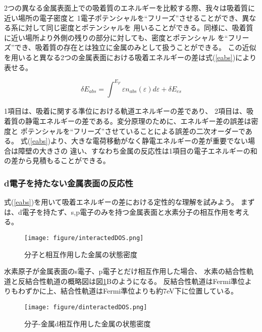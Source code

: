 \documentclass[12pt]{ltjsarticle}
\begin{document}
2つの異なる金属表面上での吸着質のエネルギーを比較する際、我々は吸着質に近い場所の電子密度と
1電子ポテンシャルを“フリーズ”させることができ、異なる系に対して同じ密度とポテンシャルを
用いることができる。同様に、吸着質に近い場所より外側の残りの部分に対しても、密度とポテンシャル
を“フリーズ”でき、吸着質の存在とは独立に金属のみとして扱うことができる。
この近似を用いると異なる2つの金属表面における吸着エネルギーの差は式(\ref{eabs})により表せる。

\begin{equation}
    \label{eabs}
    \delta E_{abs} = \int_{}^{E_F} \varepsilon n_{abs}(\varepsilon) d\varepsilon + 
    \delta E_{es}
\end{equation}

1項目は、吸着に関する準位における軌道エネルギーの差であり、
2項目は、吸着質の静電エネルギーの差である。変分原理のために、エネルギー差の誤差は密度と
ポテンシャルを“フリーズ”させていることによる誤差の二次オーダーである。
式(\ref{eabs})より、大きな電荷移動がなく静電エネルギーの差が重要でない場合は障壁の大きさの
違い、すなわち金属の反応性は1項目の電子エネルギーの和の差から見積もることができる。

\subsubsection{d電子を持たない金属表面の反応性}
式(\ref{eabs})を用いて吸着エネルギーの差における定性的な理解を試みよう。
まずは、d電子を持たず、s,p電子のみを持つ金属表面と水素分子の相互作用を考える。

\begin{figure}[hbtp]
    \begin{center}
     \texttt{[image: figure/interactedDOS.png]}
    \end{center}
    \caption{分子と相互作用した金属の状態密度}
    \label{fig:interactedDOS}
\end{figure}

水素原子が金属表面のs電子、p電子とだけ相互作用した場合、
水素の結合性軌道と反結合性軌道の概略図は図\ref{fig:interactedDOS}Bのようになる。
反結合性軌道はFermi準位よりもわずかに上、結合性軌道はFermi準位よりも約7eV下に位置している。

\begin{figure}[hbtp]
    \begin{center}
     \texttt{[image: figure/dinteractedDOS.png]}
    \end{center}
    \caption{分子-金属d相互作用した金属の状態密度}
    \label{fig:dinteractedDOS}
\end{figure}
\end{document}
